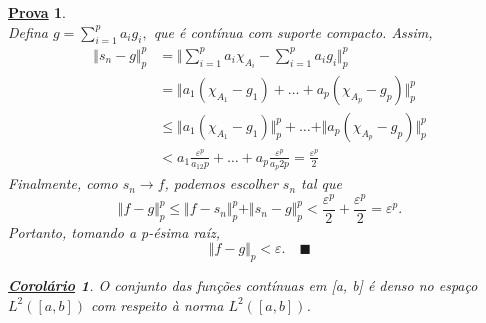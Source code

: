 \documentclass{article}
\newtheorem*{proof*}{\underline{Prova}}
\newtheorem*{crl*}{\underline{Corolário}}
\renewcommand\qedsymbol{$\blacksquare$}
\begin{document}
\begin{proof*}
\[      \]
  Defina \(g = \sum\limits_{i=1}^{p}a_{i}g_{i},\) que é contínua com suporte compacto. Assim,
 \begin{align*}
   \Vert s_{n}-g \Vert_{p}^{p} &= \biggl\Vert \sum\limits_{i=1}^{p}a_{i}\chi_{A_{i}}-\sum\limits_{i=1}^{p}a_{i}g_{i} \biggr\Vert_{p}^{p}\\ 
                               &= \Vert a_1(\chi_{A_1}-g_1) + \dotsc + a_{p}(\chi_{A_p} - g_p) \Vert_{p}^{p} \\ 
                               &\leq \Vert a_1(\chi_{A_1}-g_1) \Vert_{p}^{p} + \dotsc + \Vert a_p(\chi_{A_p}-g_p) \Vert_{p}^{p}\\ 
                               &< a_1\frac{\varepsilon ^{p}}{a_12p} + \dotsc + a_p\frac{\varepsilon ^{p}}{a_p2p} = \frac{\varepsilon^{p}}{2}
 \end{align*}
  Finalmente, como \(s_{n}\to f\), podemos escolher \(s_{n}\) tal que 
    \[
      \Vert f-g \Vert_{p}^{p}\leq \Vert f-s_{n} \Vert_{p}^{p}+\Vert s_{n}-g \Vert_{p}^{p}<\frac{\varepsilon ^{p}}{2}+\frac{\varepsilon^{p}}{2} = \varepsilon^{p}.
    \]
  Portanto, tomando a p-ésima raíz,
    \[
      \Vert f-g \Vert_{p} < \varepsilon .\quad \text{\qedsymbol}
    \]

\begin{crl*}
  O conjunto das funções contínuas em [a, b] é denso no espaço \(L^{2}([a, b])\) com respeito à norma \(L^{2}([a, b])\).
\end{crl*}
  
\end{proof*}
\end{document}
